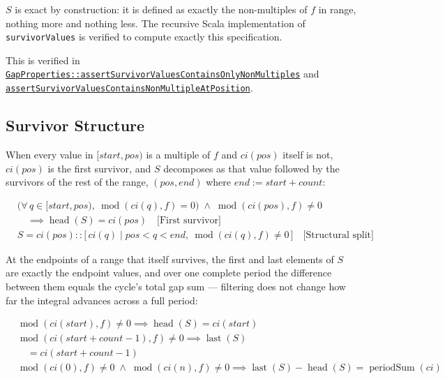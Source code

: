 $S$ is exact by construction: it is defined as exactly the non-multiples of
$f$ in range, nothing more and nothing less. The recursive Scala
implementation of \texttt{survivorValues} is verified to compute exactly
this specification.

{\raggedright
This is verified in
\href{https://github.com/thiagomata/prime-numbers/blob/integral-cycle-article-v1.0.0/src/main/scala/v1/chapter4/cycle/integral/recursive/properties/GapProperties.scala}{\texttt{GapProperties::\allowbreak assertSurvivorValuesContainsOnlyNonMultiples}}
and
\href{https://github.com/thiagomata/prime-numbers/blob/integral-cycle-article-v1.0.0/src/main/scala/v1/chapter4/cycle/integral/recursive/properties/GapProperties.scala}{\texttt{assertSurvivorValuesContainsNonMultipleAtPosition}}.
\par}

\subsection{Survivor Structure}

When every value in $[start, pos)$ is a multiple of $f$ and $ci(pos)$
itself is not, $ci(pos)$ is the first survivor, and $S$ decomposes as that
value followed by the survivors of the rest of the range, $(pos, end)$
where $end := start + count$:

\begin{equation*}
\begin{aligned}
&\big(\forall\, q \in [start, pos),\ \operatorname{mod}(ci(q), f) = 0\big)
  \;\land\; \operatorname{mod}(ci(pos), f) \neq 0 \\
&\quad \implies \operatorname{head}(S) = ci(pos)
  \quad \text{[First survivor]} \\
&S = ci(pos) :: \big[\, ci(q) \mid pos < q < end,\ \operatorname{mod}(ci(q), f) \neq 0 \,\big]
  \quad \text{[Structural split]}
\end{aligned}
\end{equation*}

At the endpoints of a range that itself survives, the first and last
elements of $S$ are exactly the endpoint values, and over one complete
period the difference between them equals the cycle's total gap sum ---
filtering does not change how far the integral advances across a full
period:

\begin{equation*}
\begin{aligned}
&\operatorname{mod}(ci(start), f) \neq 0
  \implies \operatorname{head}(S) = ci(start) \\
&\operatorname{mod}(ci(start + count - 1), f) \neq 0
  \implies \operatorname{last}(S) \\
&\quad = ci(start + count - 1) \\
&\operatorname{mod}(ci(0), f) \neq 0 \;\land\; \operatorname{mod}(ci(n), f) \neq 0
  \implies \operatorname{last}(S) - \operatorname{head}(S) = \operatorname{periodSum}(ci)
\end{aligned}
\end{equation*}

